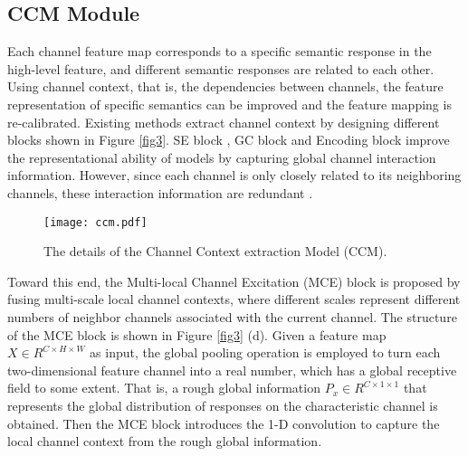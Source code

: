 \documentclass[10pt,journal,cspaper,compsoc]{IEEEtran}
\begin{document}
\subsection{CCM Module}
Each channel feature map corresponds to a specific semantic response in the high-level feature, and different semantic responses are related to each other. Using channel context, that is, the dependencies between channels, the feature representation of specific semantics can be improved and the feature mapping is re-calibrated. Existing methods extract channel context by designing different blocks shown in Figure \ref{fig3}. SE block \cite{hu2018squeeze}, GC block \cite{cao2019gcnet} and Encoding block \cite{zhang2018context} improve the representational ability of models by capturing global channel interaction information. However, since each channel is only closely related to its neighboring channels, these interaction information are redundant \cite{wang2020eca}.
\begin{figure}[t]
\centering
\texttt{[image: ccm.pdf]}
\caption{The details of the Channel Context extraction Model (CCM).}
\label{fig4}
\vspace{-4mm}
\end{figure}
	
Toward this end, the Multi-local Channel Excitation (MCE) block is proposed by fusing multi-scale local channel contexts, where different scales represent different numbers of neighbor channels associated with the current channel. The structure of the MCE block is shown in Figure \ref{fig3} (d). Given a feature map $X\in R^{C\times H\times W}$ as input, the global pooling operation is employed to turn each two-dimensional feature channel into a real number, which has a global receptive field to some extent. That is, a rough global information $P_{x}\in R^{C\times 1\times 1}$ that  represents the global distribution of responses on the characteristic channel is obtained. Then the MCE block introduces the 1-D convolution to capture the local channel context from the rough global information.
	
\end{document}
